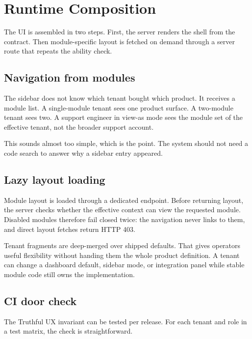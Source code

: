 \section{Runtime Composition}
\label{sec:runtime_composition}

The UI is assembled in two steps. First, the server renders the shell from the  contract. Then module-specific layout is fetched on demand through a server route that repeats the ability check.

\subsection{Navigation from modules}
\label{sec:navigation_from_modules}

The sidebar does not know which tenant bought which product. It receives a module list. A single-module tenant sees one product surface. A two-module tenant sees two. A support engineer in view-as mode sees the module set of the effective tenant, not the broader support account.

This sounds almost too simple, which is the point. The system should not need a code search to answer why a sidebar entry appeared.

\subsection{Lazy layout loading}
\label{sec:lazy_layout}

Module layout is loaded through a dedicated endpoint. Before returning layout, the server checks whether the effective context can view the requested module. Disabled modules therefore fail closed twice: the navigation never links to them, and direct layout fetches return HTTP 403.

Tenant fragments are deep-merged over shipped defaults. That gives operators useful flexibility without handing them the whole product definition. A tenant can change a dashboard default, sidebar mode, or integration panel while stable module code still owns the implementation.

\subsection{CI door check}
\label{sec:ci_door_check}

The Truthful UX invariant can be tested per release. For each tenant and role in a test matrix, the check is straightforward.

